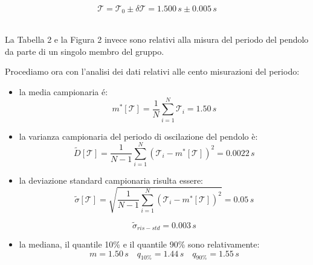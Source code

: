 \begin{equation}
\mathcal{T} = \mathcal{T}_0 \pm \delta\mathcal{T} = 1.500\,s \pm 0.005\,s
\end{equation}\\

\newpage

La Tabella 2 e la Figura 2 invece sono relativi alla misura del periodo del pendolo da parte di un singolo membro del gruppo.


Procediamo ora con l'analisi dei dati relativi alle cento misurazioni del periodo:

\begin{itemize}
    \item{la media campionaria é:}
        \begin{equation}
            m^*[\mathcal{T}] = \frac{1}{N} \sum_{i=1}^{N} \mathcal{T}_i = 1.50\,s
        \end{equation} 

    \item{la varianza campionaria del periodo di oscilazione del pendolo è:}
        \begin{equation}
            \tilde{D}[\mathcal{T}] = \frac{1}{N - 1} \sum_{i=1}^{N} (\mathcal{T}_i - m^*[\mathcal{T}])^2 = 0.0022\,s
        \end{equation}

    \item{la deviazione standard campionaria risulta essere:}
        \begin{equation}
            \tilde{\sigma}[\mathcal{T}] = \sqrt{\frac{1}{N - 1} \sum_{i=1}^{N} (\mathcal{T}_i - m^*[\mathcal{T}])^2} = 0.05\,s
        \end{equation}

        \begin{equation}
            \tilde{\sigma}_{ris-std} = 0.003\,s
        \end{equation}

    \item{la mediana, il quantile 10\% e il quantile 90\% sono relativamente:}
        \begin{equation*}
            m = 1.50\,s \quad
            q_{10\%} = 1.44\,s \quad
            q_{90\%} = 1.55\,s
        \end{equation*}
\end{itemize}

